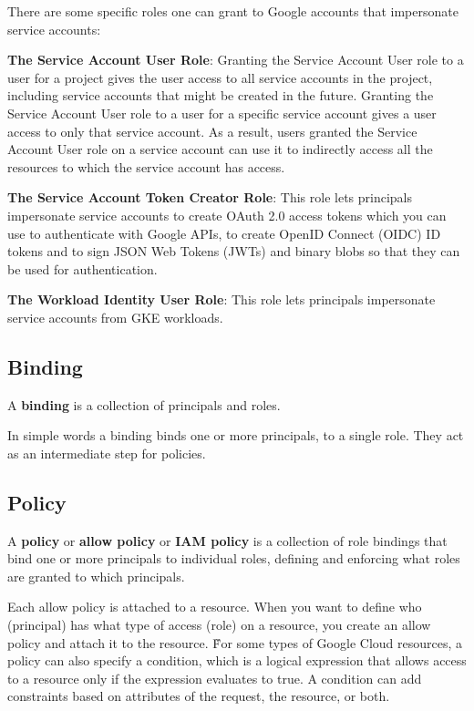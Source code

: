 There are some specific roles one can grant to Google accounts that impersonate service accounts:
\bit
\item \textbf{The Service Account User Role}: Granting the Service Account User role to a user for a project gives
the user access to all service accounts in the project, including service accounts that might be created in the
future. Granting the Service Account User role to a user for a specific service account gives a user access to only
that service account. As a result, users granted the Service Account User role on a service account can use it to
indirectly access all the resources to which the service account has access.
\item \textbf{The Service Account Token Creator Role}: This role lets principals impersonate service accounts to create
OAuth 2.0 access tokens which you can use to authenticate with Google APIs, to create OpenID Connect (OIDC) ID
tokens and to sign JSON Web Tokens (JWTs) and binary blobs so that they can be used for authentication.
\item \textbf{The Workload Identity User Role}: This role lets principals impersonate service accounts from GKE
workloads.
\eit

\subsection{Binding}

\bd[Binding]
A \textbf{binding} is a collection of principals and roles.
\ed

In simple words a binding binds one or more principals, to a single role. They act as an intermediate step for policies.

\subsection{Policy}

A \textbf{policy} or \textbf{allow policy} or \textbf{IAM policy} is a collection of role bindings that bind one or more
principals to individual roles, defining and enforcing what roles are granted to which principals.
\ed

Each allow policy is attached to a resource. When you want to define who (principal) has what type of access (role)
on a resource, you create an allow policy and attach it to the resource. \v

For some types of Google Cloud resources, a policy can also specify a condition, which is a logical expression that
allows access to a resource only if the expression evaluates to true. A condition can add constraints based on
attributes of the request, the resource, or both.

